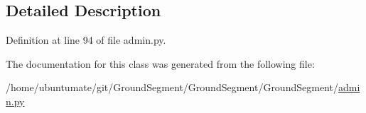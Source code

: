 \subsection{Detailed Description}


Definition at line 94 of file admin.\+py.



The documentation for this class was generated from the following file\+:\begin{DoxyCompactItemize}
\item 
/home/ubuntumate/git/\+Ground\+Segment/\+Ground\+Segment/\+Ground\+Segment/\hyperlink{admin_8py}{admin.\+py}\end{DoxyCompactItemize}
